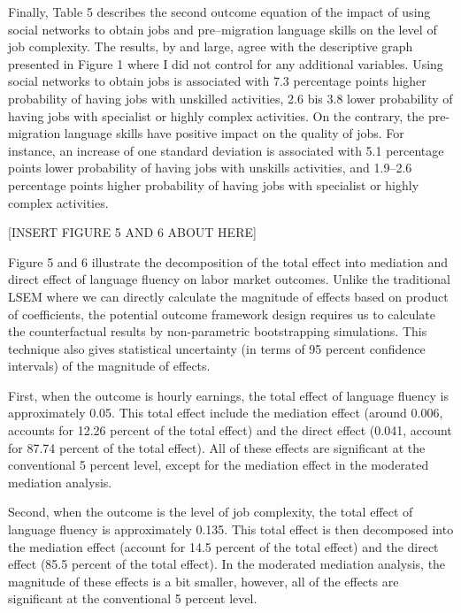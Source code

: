 \documentclass[12pt,a4paper]{article}
\begin{document}
Finally, Table 5 describes the second outcome equation of the impact of using social networks to obtain jobs and pre--migration language skills on the level of job complexity. The results, by and large, agree with the descriptive graph presented in Figure 1 where I did not control for any additional variables. Using social networks to obtain jobs is associated with 7.3 percentage points higher probability of having jobs with unskilled activities, 2.6 bis 3.8 lower probability of having jobs with specialist or highly complex activities. On the contrary, the pre-migration language skills have positive impact on the quality of jobs. For instance, an increase of one standard deviation is associated with 5.1 percentage points lower probability of having jobs with unskills activities, and 1.9--2.6 percentage points higher probability of having jobs with specialist or highly complex activities. 


\begin{center}
[INSERT FIGURE 5 AND 6 ABOUT HERE]
\end{center}

Figure 5 and 6 illustrate the decomposition of the total effect into mediation and direct effect of language fluency on labor market outcomes. Unlike the traditional LSEM where we can directly calculate the magnitude of effects based on product of coefficients, the potential outcome framework design requires us to calculate the counterfactual results by non-parametric bootstrapping simulations. This technique also gives statistical uncertainty (in terms of 95 percent confidence intervals) of the magnitude of effects.

First, when the outcome is hourly earnings, the total effect of language fluency is approximately 0.05. This total effect include the mediation effect (around 0.006, accounts for 12.26 percent of the total effect) and the direct effect (0.041, account for 87.74 percent of the total effect). All of these effects are significant at the conventional 5 percent level, except for the mediation effect in the moderated mediation analysis.

Second, when the outcome is the level of job complexity, the total effect of language fluency is approximately 0.135. This total effect is then decomposed into the mediation effect (account for 14.5 percent of the total effect) and the direct effect (85.5 percent of the total effect). In the moderated mediation analysis, the magnitude of these effects is a bit smaller, however, all of the effects are significant at the conventional 5 percent level.
\end{document}

